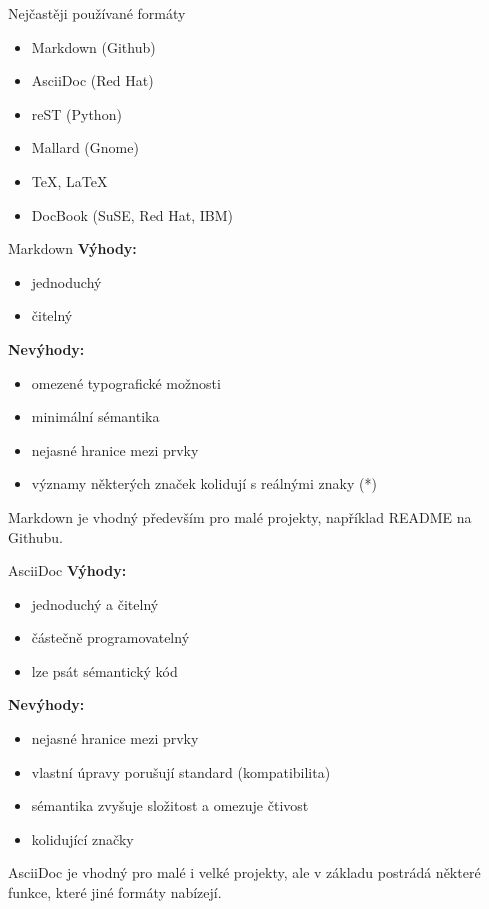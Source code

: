 \documentclass[12pt,a4paper]{beamer}
\begin{document}
	\begin{frame}{Nejčastěji používané formáty}
		\begin{itemize}
			\item Markdown (Github)
			\item AsciiDoc (Red Hat)
			\item reST (Python)
			\item Mallard (Gnome)
			\item \TeX, \LaTeX
			\item DocBook (SuSE, Red Hat, IBM)
		\end{itemize}
	\end{frame}

	\begin{frame}{Markdown}
	\textbf{Výhody:}
	\begin{itemize}
		\item jednoduchý
		\item čitelný
	\end{itemize}	
	\textbf{Nevýhody:}
	\begin{itemize}
		\item omezené typografické možnosti
		\item minimální sémantika
		\item nejasné hranice mezi prvky
		\item významy některých značek kolidují s reálnými znaky (*)
	\end{itemize}				
	Markdown je vhodný především pro malé projekty, například README na Githubu.
	\end{frame}

	\begin{frame}{AsciiDoc}
	\textbf{Výhody:}
	\begin{itemize}
		\item jednoduchý a čitelný
		\item částečně programovatelný
		\item lze psát sémantický kód
	\end{itemize}	
	\textbf{Nevýhody:}
	\begin{itemize}
		\item nejasné hranice mezi prvky
		\item vlastní úpravy porušují standard (kompatibilita)
		\item sémantika zvyšuje složitost a omezuje čtivost
		\item kolidující značky
	\end{itemize}				
	AsciiDoc je vhodný pro malé i velké projekty, ale v základu postrádá některé funkce, které jiné formáty nabízejí.
	\end{frame}
    
\end{document}
